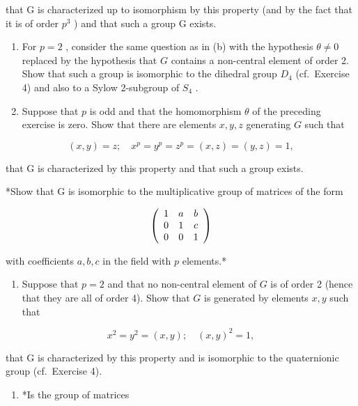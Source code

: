 that G is characterized up to isomorphism by this property (and by the fact that it is of order \(p^{3}\) ) and that such a group G exists.

\begin{enumerate}
\def\labelenumi{(\alph{enumi})}
\setcounter{enumi}{2}
\item
  For \(p = 2\) , consider the same question as in (b) with the hypothesis \(\theta \neq 0\) replaced by the hypothesis that \(G\) contains a non-central element of order 2. Show that such a group is isomorphic to the dihedral group \(D_4\) (cf.~Exercise 4) and also to a Sylow 2-subgroup of \(S_4\) .
\item
  Suppose that \(p\) is odd and that the homomorphism \(\theta\) of the preceding exercise is zero. Show that there are elements \(x, y, z\) generating \(G\) such that
\end{enumerate}

\[
(x, y) = z; \quad x ^ {p} = y ^ {p} = z ^ {p} = (x, z) = (y, z) = 1,
\]

that G is characterized by this property and that such a group exists.

*Show that G is isomorphic to the multiplicative group of matrices of the form

\[
\left( \begin{array}{c c c} 1 & a & b \\ 0 & 1 & c \\ 0 & 0 & 1 \end{array} \right)
\]

with coefficients \(a, b, c\) in the field with \(p\) elements.*

\begin{enumerate}
\def\labelenumi{(\alph{enumi})}
\setcounter{enumi}{4}
\tightlist
\item
  Suppose that \(p = 2\) and that no non-central element of \(G\) is of order 2 (hence that they are all of order 4). Show that \(G\) is generated by elements \(x, y\) such that
\end{enumerate}

\[
x ^ {2} = y ^ {2} = (x, y); \quad (x, y) ^ {2} = 1,
\]

that G is characterized by this property and is isomorphic to the quaternionic group (cf.~Exercise 4).

\begin{enumerate}
\def\labelenumi{(\alph{enumi})}
\setcounter{enumi}{5}
\tightlist
\item
  *Is the group of matrices
\end{enumerate}

